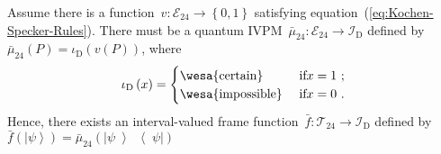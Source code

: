 \documentclass[english,reprint, aps, prl,superscriptaddress, showpacs,
showkeys]{revtex4-1}
\theoremstyle{plain}
\theoremstyle{definition}
\newcommand{\events}{\ensuremath{\mathcal{E}}}
\newcommand{\imposs}{{\mbox{\wesa{impossible}}}}
\newcommand{\necess}{{\mbox{\wesa{certain}}}}
\newcommand{\ket}[1]{{\left\vert{#1}\right\rangle}}
\newcommand{\op}[2]{\ensuremath{\left\vert{#1}\middle\rangle\middle\langle{#2}\right\vert}}
\newcommand{\proj}[1]{\op{#1}{#1}}
\begin{document}
Assume there is a function~$v:\events_{24}\rightarrow\left\{ 0,1\right\} $
satisfying equation~(\ref{eq:Kochen-Specker-Rules}). There must
be a quantum IVPM~$\bar{\mu}_{24}:\events_{24}\rightarrow\mathscr{I}_{\mathrm{D}}$
defined by $\bar{\mu}_{24}\left(P\right)=\iota_{\mathrm{D}}\left(v\left(P\right)\right)$,
where 
\begin{equation}
\iota_{\mathrm{D}}\left(x\right)=\begin{cases}
\necess & \text{ if}x=1\text{ ;}\\
\imposs & \text{ if}x=0\text{ .}
\end{cases}\label{eq:homomorphism-0}
\end{equation}
Hence, there exists an interval-valued frame function~$\bar{f}:\mathcal{T}_{24}\rightarrow\mathscr{I}_{\mathrm{D}}$
defined by $\bar{f}\left(\ket{\psi}\right)=\bar{\mu}_{24}\left(\proj{\psi}\right)$
\end{document}
